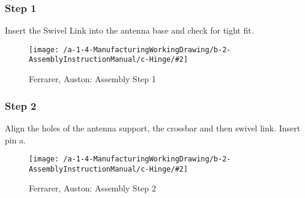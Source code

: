 \newcommand{\AssemblyManualHinge}[3]{
\subsubsection{Step #1}
\begin{center}
#3
\begin{figure}[!ht]
\texttt{[image: /a-1-4-ManufacturingWorkingDrawing/b-2-AssemblyInstructionManual/c-Hinge/\#2]}
\caption{Ferrarer, Auston: Assembly Step #1}
\end{figure}
\end{center}
}

\AssemblyManualHinge{1}{step1.jpeg}{
Insert the Swivel Link into the antenna base and check for tight fit.
}
\AssemblyManualHinge{2}{step2.jpeg}{
Align the holes of the antenna support, the crossbar and then swivel link. Insert pin a.
}

